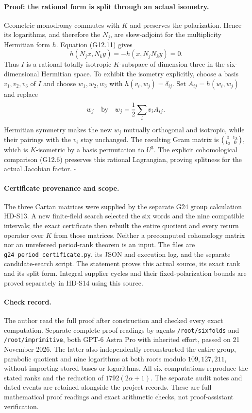 \paragraph{Proof: the rational form is split through an actual isometry.}
Geometric monodromy commutes with $K$ and preserves the polarization.
Hence its logarithms, and therefore the $N_j$, are skew-adjoint for
the multiplicity Hermitian form $h$. Equation (G12.11) gives
\[
h(N_jx,N_ky)=-h(x,N_jN_ky)=0.
\]
Thus $I$ is a rational totally isotropic $K$-subspace of dimension
three in the six-dimensional Hermitian space. To exhibit the
isometry explicitly, choose a basis $v_1,v_2,v_3$ of $I$ and
choose $w_1,w_2,w_3$ with $h(v_i,w_j)=\delta_{ij}$.
Set $A_{ij}=h(w_i,w_j)$ and replace
\[
w_j\quad\hbox{by}\quad
w_j-\frac12\sum_i v_iA_{ij}.
\]
Hermitian symmetry makes the new $w_j$ mutually orthogonal and
isotropic, while their pairings with the $v_i$ stay unchanged.
The resulting Gram matrix is
$\begin{psmallmatrix}0&1_3\\1_3&0\end{psmallmatrix}$,
which is $K$-isometric by a basis permutation to $U^3$.
The explicit cohomological comparison (G12.6) preserves this
rational Lagrangian, proving splitness for the actual Jacobian factor.
\hfill$\square$

\paragraph{Certificate provenance and scope.}
The three Cartan matrices were supplied by the separate G24 group
calculation HD-S13. A new finite-field search selected the six words
and the nine compatible intervals; the exact certificate then rebuilt
the entire quotient and every return operator over $K$ from those
matrices. Neither a precomputed cohomology matrix nor an unrefereed
period-rank theorem is an input. The files are
\texttt{g24\_period\_certificate.py}, its JSON and execution log,
and the separate candidate-search script. The statement proves this
actual source, its exact rank and its split form. Integral supplier
cycles and their fixed-polarization bounds are proved separately in
HD-S14 using this source.

\paragraph{Check record.}
The author read the full proof after construction and checked every
exact computation. Separate complete proof readings by agents
\texttt{/root/sixfolds} and \texttt{/root/imprimitive}, both
GPT-6 Astra Pro with inherited effort, passed on 21 November 2026.
The latter also independently reconstructed the entire group,
parabolic quotient and nine logarithms at both roots modulo
$109,127,211$, without importing stored bases or logarithms.
All six computations reproduce the stated ranks and the reduction
of $1792(2\alpha+1)$. The separate audit notes and dated events
are retained alongside the project records. These are full mathematical
proof readings and exact arithmetic checks, not proof-assistant verification.
